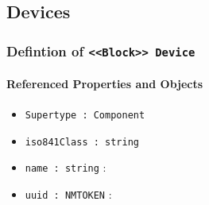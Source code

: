 \subsection{Devices} \label{model:Devices}
\subsubsection{Defintion of \texttt{<<Block>> Device}}
  \label{type:Device}

\FloatBarrier



\FloatBarrier
\paragraph{Referenced Properties and Objects}

\begin{itemize}
\item \texttt{Supertype : Component}

\item \texttt{iso841Class : string}

\item \texttt{name : string} : \texttt{}

\item \texttt{uuid : NMTOKEN} : \texttt{}

\end{itemize}
\FloatBarrier
